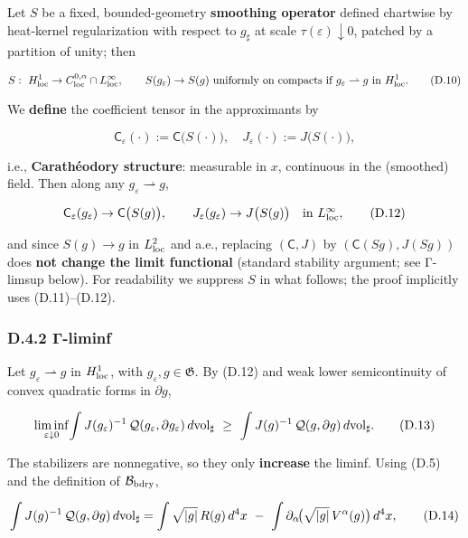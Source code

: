 \documentclass[
]{article}
\numberwithin{equation}{section}
\begin{document}
Let \(S\) be a fixed, bounded-geometry \textbf{smoothing operator}
defined chartwise by heat-kernel regularization with respect to
\(g_\sharp\) at scale \(\tau(\varepsilon)\downarrow 0\), patched by a
partition of unity; then

\[
S:\ H^1_{\rm loc}\to C^{0,\alpha}_{\rm loc}\cap L^\infty_{\rm loc},\qquad
S(g_\varepsilon)\to S(g)\ \text{uniformly on compacts if }g_\varepsilon\rightharpoonup g\text{ in }H^1_{\rm loc}.
\tag{D.10}
\]

We \textbf{define} the coefficient tensor in the approximants by

\[
\mathsf C_\varepsilon(\cdot):=\mathsf C\big(S(\cdot)\big),\quad
J_\varepsilon(\cdot):=J\big(S(\cdot)\big),
\tag{D.11}
\]

i.e., \textbf{Carathéodory structure}: measurable in \(x\), continuous
in the (smoothed) field. Then along any
\(g_\varepsilon\rightharpoonup g\),

\[
\mathsf C_\varepsilon(g_\varepsilon)\to \mathsf C\big(S(g)\big),\qquad
J_\varepsilon(g_\varepsilon)\to J\big(S(g)\big)
\quad\text{in }L^\infty_{\rm loc},
\tag{D.12}
\]

and since \(S(g)\to g\) in \(L^2_{\rm loc}\) and a.e., replacing
\((\mathsf C,J)\) by \((\mathsf C(Sg),J(Sg))\) does \textbf{not change
the limit functional} (standard stability argument; see Γ-limsup below).
For readability we suppress \(S\) in what follows; the proof implicitly
uses (D.11)--(D.12).

\hypertarget{d.4.2-ux3b3-liminf}{%
\subsubsection{D.4.2 Γ-liminf}\label{d.4.2-ux3b3-liminf}}

Let \(g_\varepsilon\rightharpoonup g\) in \(H^1_{\rm loc}\), with
\(g_\varepsilon,g\in\mathfrak G\). By (D.12) and weak lower
semicontinuity of convex quadratic forms in \(\partial g\),

\[
\liminf_{\varepsilon\downarrow 0}\!\int J(g_\varepsilon)^{-1}\,\mathcal Q(g_\varepsilon,\partial g_\varepsilon)\,d{\rm vol}_\sharp
\ \ge\
\int J(g)^{-1}\,\mathcal Q(g,\partial g)\,d{\rm vol}_\sharp.
\tag{D.13}
\]

The stabilizers are nonnegative, so they only \textbf{increase} the
liminf. Using (D.5) and the definition of \(\mathcal B_{\rm bdry}\),

\[
\int J(g)^{-1}\,\mathcal Q(g,\partial g)\,d{\rm vol}_\sharp
=\int \sqrt{|g|}\,R(g)\,d^4x\ -\ \int \partial_\alpha\!\big(\sqrt{|g|}\,V^\alpha(g)\big)\,d^4x,
\tag{D.14}
\]
\end{document}
